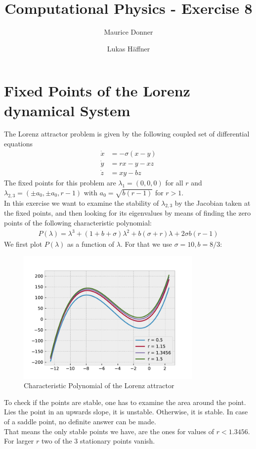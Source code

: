 \documentclass{article}
\title{Computational Physics - Exercise 8}
\author{Maurice Donner \and Lukas Häffner}
\begin{document}
\maketitle
\newpage

\section{Fixed Points of the Lorenz dynamical System}

The Lorenz attractor problem is given by the following coupled set of 
differential equations
\begin{align}
    \dot x &= - \sigma (x - y ) \\
    \dot y &= rx - y - xz \\
    \dot z &= xy - bz
    \label{Lorenz}
\end{align}
The fixed points for this problem are \( \lambda_1 = (0,0,0) \) for all \( r \)
and \( \lambda_{2,3} = (\pm a_0, \pm a_0, r-1 )\) with \( a_0 = 
    \sqrt{b(r-1)}\) for \( r > 1 \).\\
In this exercise we want to examine the stability of \( \lambda_{2,3} \) by the
Jacobian taken at the fixed points, and then looking for its eigenvalues by means
of finding the zero points of the following characteristic polynomial:
\begin{align}
    P(\lambda) = \lambda^3 + (1+b+\sigma)\lambda^2 +b(\sigma+r)\lambda
    + 2 \sigma b (r-1)
\end{align}
We first plot $P(\lambda)$ as a function of \( \lambda \). For that we use
\( \sigma = 10, b = 8/3 \):
\begin{figure}[H]
    \centering
    \includegraphics[width=9cm]{polynomial.pdf} 
    \caption{Characteristic Polynomial of the Lorenz attractor} 
\end{figure}
To check if the points are stable, one has to examine the area around the point.
Lies the point in an upwards slope, it is unstable. Otherwise, it is stable.
In case of a saddle point, no definite answer can be made.\\
That means the only stable points we have, are the ones for values of
\( r < 1.3456 \). For larger \( r \) two of the 3 stationary points vanish.\\
\end{document}

